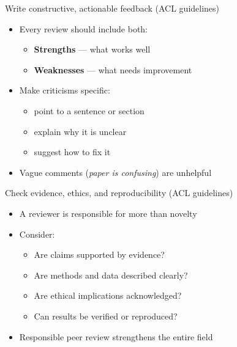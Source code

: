 \documentclass[aspectratio=169]{beamer}
\begin{document}

\begin{frame}{Write constructive, actionable feedback (ACL guidelines)}
\begin{itemize}
  \item Every review should include both:
    \begin{itemize}
      \item \textbf{Strengths} — what works well
      \item \textbf{Weaknesses} — what needs improvement
    \end{itemize}
  \item Make criticisms specific:
    \begin{itemize}
      \item point to a sentence or section
      \item explain why it is unclear
      \item suggest how to fix it
    \end{itemize}
  \item Vague comments (\textit{paper is confusing}) are unhelpful
\end{itemize}

\end{frame}


\begin{frame}{Check evidence, ethics, and reproducibility (ACL guidelines)}
\begin{itemize}
  \item A reviewer is responsible for more than novelty
  \item Consider:
    \begin{itemize}
      \item Are claims supported by evidence?
      \item Are methods and data described clearly?
      \item Are ethical implications acknowledged?
      \item Can results be verified or reproduced?
    \end{itemize}
  \item Responsible peer review strengthens the entire field
\end{itemize}

\end{frame}
\end{document}
